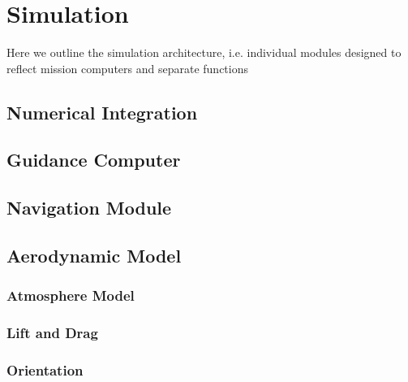 \section{Simulation}
Here we outline the simulation architecture, i.e. individual modules designed to reflect mission computers and separate functions

\subsection{Numerical Integration}
\subsection{Guidance Computer}
\subsection{Navigation Module}
\subsection{Aerodynamic Model}
\subsubsection{Atmosphere Model}
\subsubsection{Lift and Drag}
\subsubsection{Orientation}

